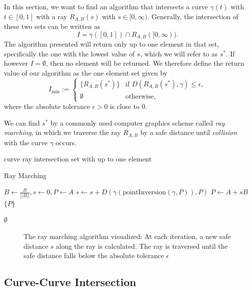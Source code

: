 \documentclass[a4paper, 11pt]{report}
\theoremstyle{definition}
\renewcommand{\emph}[1]{\textit{#1}}
\newcommand{\Desc}[2]{\State \makebox[12em][l]{#1}#2}
\begin{document}
	In this section, we want to find an algorithm that intersects a curve $\gamma(t)$ with $t \in [0, 1]$ with a ray $R_{A,B}(s)$ with $s \in [0, \infty)$. Generally, the intersection of these two sets can be written as
		$$I = \gamma([0,1]) \cap R_{A,B}([0,\infty)).$$
	The algorithm presented will return only up to one element in that set, specifically the one with the lowest value of $s$, which we will refer to as $s^*$.
	If however $I = \emptyset$, then no element will be returned. We therefore define the return value of our algorithm as the one element set given by
		$$ I_{\min} := 
			\begin{cases}
				\{R_{A,B}(s^*)\} 	&\text{if } D(R_{A,B}(s^*), \gamma) \leq \epsilon, \\
				\emptyset			&\text{otherwise,}	
			\end{cases}
		$$
	where the absolute tolerance $\epsilon > 0$ is close to $0$.

	We can find $s^*$ by a commonly used computer graphics scheme called \emph{ray marching}, in which we traverse the ray $R_{A,B}$ by a safe distance until \emph{collision} with the curve $\gamma$ occurs.

	\begin{algorithm}[H]
		\begin{algorithmic}[1]
			\Input
				\Desc{$\gamma$}{curve}
				\Desc{$R_{A,B}$}{ray}
			\EndInput
			\Output
				\Desc{$I_{\min}$}{intersection set with up to one element}
			\EndOutput

			\caption{Ray Marching}\label{alg:raymarching}
				\State $B \gets \frac{B}{||B||}, s \gets 0, P \gets A$
					\State $s \gets s + D(\gamma(\text{pointInversion}(\gamma, P)), P)$
					\State $P \gets A + sB$
						\Return $\{P\}$
					\EndIf
				\EndFor

				\Return $\emptyset$
			\EndProcedure
		\end{algorithmic}
	\end{algorithm}

	\begin{figure}[H]
		\centering
		
		\caption{The ray marching algorithm visualized: At each iteration, a new safe distance $s$ along the ray is calculated. The ray is traversed until the safe distance falls below the absolute tolerance $\epsilon$}
	\end{figure}

\subsection{Curve-Curve Intersection}
\end{document}

